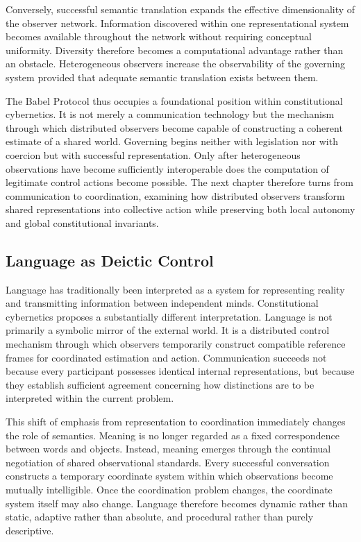 \documentclass[12pt,a4paper]{article}
\begin{document}
Conversely, successful semantic translation expands the effective dimensionality of the observer network. Information discovered within one representational system becomes available throughout the network without requiring conceptual uniformity. Diversity therefore becomes a computational advantage rather than an obstacle. Heterogeneous observers increase the observability of the governing system provided that adequate semantic translation exists between them.

The Babel Protocol thus occupies a foundational position within constitutional cybernetics. It is not merely a communication technology but the mechanism through which distributed observers become capable of constructing a coherent estimate of a shared world. Governing begins neither with legislation nor with coercion but with successful representation. Only after heterogeneous observations have become sufficiently interoperable does the computation of legitimate control actions become possible. The next chapter therefore turns from communication to coordination, examining how distributed observers transform shared representations into collective action while preserving both local autonomy and global constitutional invariants.

\subsection{Language as Deictic Control}

Language has traditionally been interpreted as a system for representing reality and transmitting information between independent minds. Constitutional cybernetics proposes a substantially different interpretation. Language is not primarily a symbolic mirror of the external world. It is a distributed control mechanism through which observers temporarily construct compatible reference frames for coordinated estimation and action. Communication succeeds not because every participant possesses identical internal representations, but because they establish sufficient agreement concerning how distinctions are to be interpreted within the current problem.

This shift of emphasis from representation to coordination immediately changes the role of semantics. Meaning is no longer regarded as a fixed correspondence between words and objects. Instead, meaning emerges through the continual negotiation of shared observational standards. Every successful conversation constructs a temporary coordinate system within which observations become mutually intelligible. Once the coordination problem changes, the coordinate system itself may also change. Language therefore becomes dynamic rather than static, adaptive rather than absolute, and procedural rather than purely descriptive.
\end{document}
